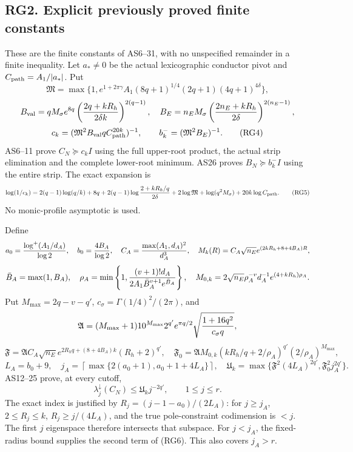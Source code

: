\documentclass[11pt]{article}
\begin{document}
\subsection{RG2. Explicit previously proved finite constants}\label{rg2.-explicit-previously-proved-finite-constants}

These are the finite constants of AS6--31, with no unspecified remainder in a finite inequality. Let \(a_*\ne0\) be the actual lexicographic conductor pivot and \(C_{\rm path}=A_1/|a_*|\). Put \[
\mathfrak M=\max\{1,e^{1+2\pi\gamma}A_1(8q+1)^{1/4}(2q+1)(4q+1)^{4\delta}\},
\] \[
B_{\rm val}=qM_\sigma e^{8q}
\left({2q+kR_h\over2\delta k}\right)^{2(q-1)},\quad
B_E=n_EM_\sigma\left({2n_E+kR_h\over2\delta}\right)^{2(n_E-1)},
\] \[
c_k=(\mathfrak M^2B_{\rm val}qC_{\rm path}^{20k})^{-1},\qquad
b_k^-=(\mathfrak M^2B_E)^{-1}.
\tag{RG4}
\] AS6--11 prove \(C_N\succeq c_kI\) using the full upper-root product, the actual strip elimination and the complete lower-root minimum. AS26 proves \(B_N\succeq b_k^-I\) using the entire strip. The exact expansion is \[
\log(1/c_k)=2(q-1)\log(q/k)+8q+
2(q-1)\log{2+kR_h/q\over2\delta}
+2\log\mathfrak M+\log(q^2M_\sigma)+20k\log C_{\rm path}.
\tag{RG5}
\] No monic-profile asymptotic is used.

Define \[
a_0={\log^+(A_1/d_A)\over\log2},\quad b_0={4B_A\over\log2},\quad
C_A={\max(A_1,d_A)^2\over d_A^3},\quad
M_k(R)=C_A\sqrt{n_E}e^{(2kR_h+8+4B_A)R},
\] \[
\bar B_A=\max(1,B_A),\quad
\rho_A=\min\left\{1,{(v+1)!d_A\over2A_1\bar B_A^{v+1}e^{\bar B_A}}\right\},\quad
M_{0,k}=2\sqrt{n_E}\rho_A^{-v}d_A^{-1}e^{(4+kR_h)\rho_A}.
\] Put \(M_{\max}=2q-v-q'\), \(c_\sigma=\Gamma(1/4)^2/(2\pi)\), and \[
\mathfrak A=(M_{\max}+1)10^{M_{\max}}2^{q'}e^{\pi q/2}
\sqrt{{1+16q^2\over c_\sigma q}},
\] \[
\mathfrak F=\mathfrak A C_A\sqrt{n_E}
e^{2R_hq+(8+4B_A)k}(R_h+2)^{q'},\quad
\mathfrak F_0=\mathfrak A M_{0,k}(kR_h/q+2/\rho_A)^{q'}(2/\rho_A)^{M_{\max}},
\] \[
L_A=b_0+9,\quad j_A=\left\lceil\max\{2(a_0+1),a_0+1+4L_A\}\right\rceil,\quad
\mathfrak U_k=\max\{\mathfrak F^2(4L_A)^{2q'},\mathfrak F_0^2j_A^{2q'}\}.
\tag{RG6}
\] AS12--25 prove, at every cutoff, \[
\lambda_j^\downarrow(C_N)\le\mathfrak U_kj^{-2q'},\qquad1\le j\le r.
\tag{RG7}
\] The exact index is justified by \(R_j=(j-1-a_0)/(2L_A)\): for \(j\ge j_A\), \(2\le R_j\le k\), \(R_j\ge j/(4L_A)\), and the true pole-constraint codimension is \(<j\). The first \(j\) eigenspace therefore intersects that subspace. For \(j<j_A\), the fixed-radius bound supplies the second term of (RG6). This also covers \(j_A>r\).
\end{document}
